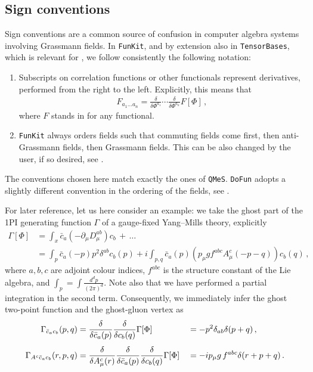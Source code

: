 \documentclass[preprint,10pt,sort&compress]{elsarticle}
\newcommand{\FunKit}{\texttt{FunKit}\xspace}
\newcommand{\TensorBases}{\texttt{TensorBases}\xspace}
\newcommand{\QMeS}{\texttt{QMeS}\xspace}
\newcommand{\DoFun}{\texttt{DoFun}\xspace}
\begin{document}
\subsection{Sign conventions}
\label{sec:Signs}

Sign conventions are a common source of confusion in computer algebra systems involving Grassmann fields. In \FunKit, and by extension also in \TensorBases, which is relevant for , we follow consistently the following notation:
%
\begin{enumerate}
	\item Subscripts on correlation functions or other functionals represent derivatives, performed from the right to the left. Explicitly, this means that
	\begin{align}
		F_{a_1\ldots a_n} = \frac{\delta }{\delta \Phi^{a_1}} \cdots \frac{\delta }{\delta \Phi^{a_n}} F[\Phi]\,,
	\end{align}
	where $F$ stands in for any functional.
	
	\item \FunKit always orders fields such that commuting fields come first, then anti-Grassmann fields, then Grassmann fields. This can be also changed by the user, if so desired, see .
\end{enumerate}
%
The conventions chosen here match exactly the ones of \QMeS. \DoFun adopts a slightly different convention in the ordering of the fields, see .

For later reference, let us here consider an example: we take the ghost part of the 1PI generating function $\Gamma$ of a gauge-fixed Yang--Mills theory, explicitly
%
\begin{align}
	\Gamma[\Phi] &= \int_x \bar{c}_a \left(-\partial_\mu D^{ab}_\mu \right) c_b \,+\,\ldots
	\\[1ex]
	 &= \int_p \bar{c}_a(-p) p^2 \delta^{ab} c_b(p) + i\int_{p,q}\bar{c}_a(p) \left( p_\mu gf^{abc}A^c_\mu(-p-q)\right) c_b(q)\,,
\end{align}
%
where $a,b,c$ are adjoint colour indices, $f^{abc}$ is the structure constant of the Lie algebra, and $\int_p = \int \frac{d^dp}{(2\pi)^d}$.
Note also that we have performed a partial integration in the second term.
Consequently, we immediately infer the ghost two-point function and the ghost-gluon vertex as
%
\begin{alignat}{2}
	\Gamma_{\bar{c}_ac_b}(p,q) &=
		\frac{\delta}{\delta\bar{c}_a(p)}\frac{\delta}{\delta c_b(q)} \Gamma[\Phi] &&=
		-p^2\delta_{ab}
			\delta(p+q)
	\,,
	\notag\\[1ex] 
	\Gamma_{A^c\bar{c}_a c_b}(r,p,q) &=
		\frac{\delta}{\delta A^c_\mu(r)}\frac{\delta}{\delta\bar{c}_a(p)}\frac{\delta}{\delta c_b(q)} \Gamma[\Phi] &&=
	 	-i p_\mu g\, f^{abc} 
			\delta(r+p+q)
	\,.	
\end{alignat}
%
\end{document}
